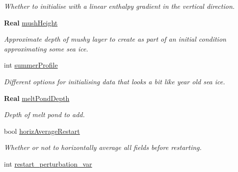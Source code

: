 \begin{DoxyCompactItemize}
\begin{DoxyCompactList}\small\item\em Whether to initialise with a linear enthalpy gradient in the vertical direction. \end{DoxyCompactList}\item 
\mbox{\label{struct_mushy_layer_options_afe698dfa41e04dcddcbc22746194d63a}} 
\textbf{ Real} \hyperlink{struct_mushy_layer_options_afe698dfa41e04dcddcbc22746194d63a}{mush\+Height}
\begin{DoxyCompactList}\small\item\em Approximate depth of mushy layer to create as part of an initial condition approximating some sea ice. \end{DoxyCompactList}\item 
int \hyperlink{struct_mushy_layer_options_a101f8a57293409a158e31d44b2aea6ed}{summer\+Profile}
\begin{DoxyCompactList}\small\item\em Different options for initialising data that looks a bit like year old sea ice. \end{DoxyCompactList}\item 
\mbox{\label{struct_mushy_layer_options_a86441170b80199c78406edc85316764d}} 
\textbf{ Real} \hyperlink{struct_mushy_layer_options_a86441170b80199c78406edc85316764d}{melt\+Pond\+Depth}
\begin{DoxyCompactList}\small\item\em Depth of melt pond to add. \end{DoxyCompactList}\item 
\mbox{\label{struct_mushy_layer_options_ae33e42350b076d90bbdec475ef0e6ff6}} 
bool \hyperlink{struct_mushy_layer_options_ae33e42350b076d90bbdec475ef0e6ff6}{horiz\+Average\+Restart}
\begin{DoxyCompactList}\small\item\em Whether or not to horizontally average all fields before restarting. \end{DoxyCompactList}\item 
\mbox{\label{struct_mushy_layer_options_af257596d4c754957aab12c03b3e48f84}} 
int \hyperlink{struct_mushy_layer_options_af257596d4c754957aab12c03b3e48f84}{restart\+\_\+perturbation\+\_\+var}

\end{DoxyCompactItemize}

